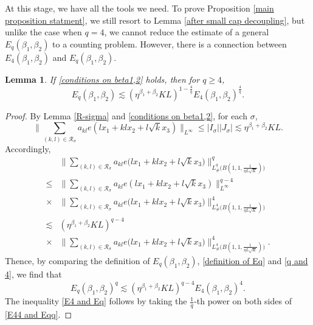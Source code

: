 \documentclass[11pt]{amsart}
\numberwithin{equation}{section}
\newtheorem{lemma}[theorem]{Lemma}
\theoremstyle{definition}
\theoremstyle{proposition}
\begin{document}
\quad

At this stage, we have all the tools we need. To prove Proposition \ref{main proposition statment}, we still resort to Lemma \eqref{after small cap decoupling}, but unlike the case when $q=4$, we cannot reduce the estimate of a general $E_q(\beta_1,\beta_2)$ to a counting problem. However, there is a connection between $E_4(\beta_1,\beta_2)$ and $E_q(\beta_1,\beta_2)$.

\begin{lemma}   \label{lemma E4 and Eq}
If \eqref{conditions on beta1,2} holds, then for $q\ge 4$, 
\begin{equation}  \label{E4 and Eq}
E_q (\beta_1,\beta_2) \lesssim (\eta^{\beta_1+\beta_2}KL)^{1-\frac{4}{q}} E_{4}(\beta_1,\beta_2)^\frac{4}{q}.    
\end{equation}
\end{lemma}

\begin{proof}
By Lemma \ref{R-sigma} and \eqref{conditions on beta1,2}, for each $\sigma$,
\[
\Big\|\sum_{(k,l)\in \mathcal R_\sigma}a_{kl}e(lx_1+klx_2+l\sqrt{k}x_3)\Big\|_{L^\infty}
\le  |I_\sigma||J_\sigma| \lesssim \eta^{\beta_1+\beta_2}KL. 
\]
Accordingly,
\begin{equation}   \label{q and 4}
\begin{split}
&\Big\|\sum_{(k,l)\in \mathcal R_\sigma} a_{kl}e\Big(lx_1+klx_2+l\sqrt{k}x_3\Big)\Big\|^q_{L^q_{\#}\Big(B(1,1,\frac{1}{\eta L \sqrt{K}})\Big)} 
\\ \le & \Big\|\sum_{(k,l)\in \mathcal R_\sigma}a_{kl}e(lx_1+klx_2+l\sqrt{k}x_3)\Big\|_{L^\infty}^{q-4}
\\ \times & \Big\|\sum_{(k,l)\in \mathcal R_\sigma} a_{kl}e\Big(lx_1+klx_2+l\sqrt{k}x_3\Big)\Big\|^4_{L^4_{\#}\Big(B(1,1,\frac{1}{\eta L \sqrt{K}})\Big)}
\\ \lesssim & (\eta^{\beta_1+\beta_2}KL)^{q-4} 
\\ \times & \Big\|\sum_{(k,l)\in \mathcal R_\sigma} a_{kl}e\Big(lx_1+klx_2+l\sqrt{k}x_3\Big)\Big\|^4_{L^4_{\#}\Big(B(1,1,\frac{1}{\eta L \sqrt{K}})\Big)}.
\end{split}    
\end{equation}
Thence, by comparing the definition of $E_q(\beta_1,\beta_2)$, \eqref{definition of Eq} and \eqref{q and 4}, we find that
\begin{equation}  \label{E44 and Eqq}
E_q(\beta_1,\beta_2)^q\lesssim (\eta^{\beta_1+\beta_2}KL)^{q-4} E_4(\beta_1,\beta_2)^4.   \end{equation}
The inequality \eqref{E4 and Eq} follows by taking the $\frac{1}{q}$-th power on both sides of \eqref{E44 and Eqq}.
\end{proof}
\end{document}
